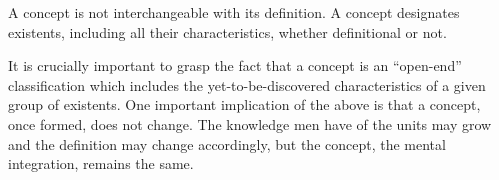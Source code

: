         A concept is not interchangeable with its definition. A concept designates existents, including all their characteristics, whether definitional or not.

        It is crucially important to grasp the fact that a concept is an ``open-end'' classification which includes the yet-to-be-discovered characteristics of a given group of existents. One important implication of the above is that a concept, once formed, does not change. The knowledge men have of the units may grow and the definition may change accordingly, but the concept, the mental integration, remains the same. 






